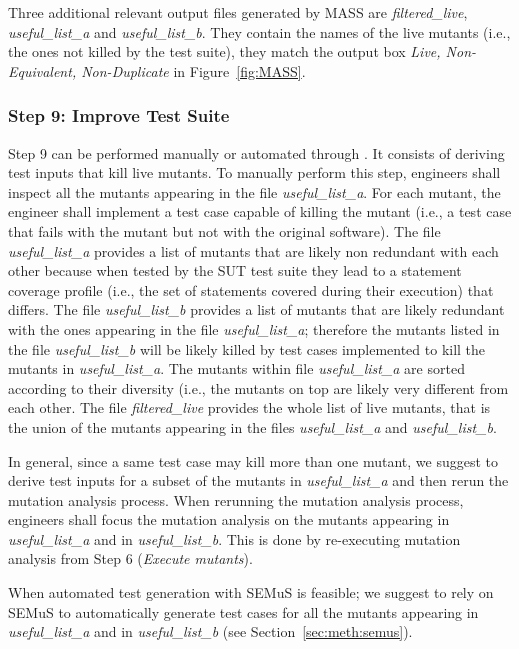 {Three additional relevant output files generated by MASS are \emph{filtered\_live}, \emph{useful\_list\_a} and \emph{useful\_list\_b}. They contain the names of the live mutants (i.e., the ones not killed by the test suite), they match the output box \emph{Live, Non-Equivalent, Non-Duplicate} in Figure~\ref{fig:MASS}.

\subsubsection{Step 9: Improve Test Suite}

Step 9 can be performed manually or automated through \SEMUS.
It consists of deriving test inputs that kill live mutants.
To manually perform this step, engineers shall inspect all the mutants appearing in the file \emph{useful\_list\_a}. For each mutant, the engineer shall implement a test case capable of killing the mutant (i.e., a test case that fails with the mutant but not with the original software).
The file \emph{useful\_list\_a} provides a list of mutants that are likely non redundant with each other because when tested by the SUT test suite they lead to a statement coverage profile (i.e., the set of statements covered during their execution) that differs.
The file \emph{useful\_list\_b} provides a list of mutants that are likely redundant with the ones appearing in the file \emph{useful\_list\_a}; therefore the mutants listed in the file \emph{useful\_list\_b} will be likely killed by test cases implemented to kill the mutants in \emph{useful\_list\_a}.
The mutants within file \emph{useful\_list\_a} are sorted according to their diversity (i.e., the mutants on top are likely very different from each other.
The file \emph{filtered\_live} provides the whole list of live mutants, that is the union of the mutants appearing in the files
\emph{useful\_list\_a} and \emph{useful\_list\_b}.

In general, since a same test case may kill more than one mutant, we suggest to derive test inputs for a subset of the mutants in \emph{useful\_list\_a} and then rerun the mutation analysis process. When rerunning the mutation analysis process, engineers shall focus the mutation analysis on the mutants appearing in \emph{useful\_list\_a} and in \emph{useful\_list\_b}. This is done by re-executing mutation analysis from Step 6 (\emph{Execute mutants}).

When automated test generation with SEMuS is feasible; we suggest to rely on SEMuS to automatically generate test cases for all the mutants appearing in \emph{useful\_list\_a} and in \emph{useful\_list\_b} (see Section~\ref{sec:meth:semus}).

}

